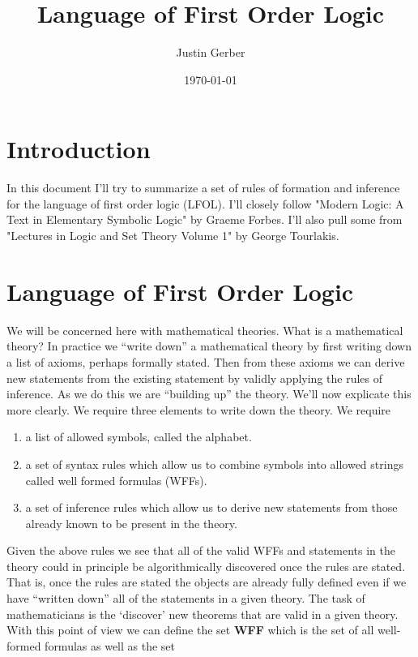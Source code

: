 \documentclass[12pt]{article}
\begin{document}
	
\title{Language of First Order Logic}
\author{Justin Gerber}
\date{\today}
\maketitle

\section{Introduction}
In this document I'll try to summarize a set of rules of formation and inference for the language of first order logic (LFOL). I'll closely follow "Modern Logic: A Text in Elementary Symbolic Logic" by Graeme Forbes. I'll also pull some from "Lectures in Logic and Set Theory Volume 1" by George Tourlakis.

\section{Language of First Order Logic}
We will be concerned here with mathematical theories. What is a mathematical theory? In practice we ``write down'' a mathematical theory by first writing down a list of axioms, perhaps formally stated. Then from these axioms we can derive new statements from the existing statement by validly applying the rules of inference. As we do this we are ``building up'' the theory. We'll now explicate this more clearly.
We require three elements to write down the theory. We require 
\begin{enumerate}
\item a list of allowed symbols, called the alphabet.
\item a set of syntax rules which allow us to combine symbols into allowed strings called well formed formulas (WFFs).
\item a set of inference rules which allow us to derive new statements from those already known to be present in the theory.
\end{enumerate}

Given the above rules we see that all of the valid WFFs and statements in the theory could in principle be algorithmically discovered once the rules are stated. That is, once the rules are stated the objects are already fully defined even if we have ``written down'' all of the statements in a given theory. The task of mathematicians is the `discover' new theorems that are valid in a given theory. With this point of view we can define the set \textbf{WFF} which is the set of all well-formed formulas as well as the set 
\end{document}
